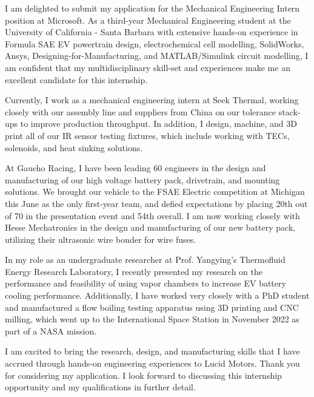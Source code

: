 \documentclass[11pt, letterpaper]{awesome-cv} %
\begin{document}
\makecvheader %

\makelettertitle %


\begin{cvletter}


I am delighted to submit my application for the Mechanical Engineering Intern position at Microsoft. As a third-year Mechanical Engineering student at the University of California - Santa Barbara with extensive hands-on experience in Formula SAE EV powertrain design, electrochemical cell modelling, SolidWorks, Ansys, Designing-for-Manufacturing, and MATLAB/Simulink circuit modelling, I am confident that my multidisciplinary skill-set and experiences make me an excellent candidate for this internship.

Currently, I work as a mechanical engineering intern at Seek Thermal, working closely with our assembly line and suppliers from China on our tolerance stack-ups to improve production throughput. In addition, I design, machine, and 3D print all of our IR sensor testing fixtures, which include working with TECs, solenoids, and heat sinking solutions.

At Gaucho Racing, I have been leading 60 engineers in the design and manufacturing of our high voltage battery pack, drivetrain, and mounting solutions. We brought our vehicle to the FSAE Electric competition at Michigan this June as the only first-year team, and defied expectations by placing 20th out of 70 in the presentation event and 54th overall. I am now working closely with Hesse Mechatronics in the design and manufacturing of our new battery pack, utilizing their ultrasonic wire bonder for wire fuses. 

In my role as an undergraduate researcher at Prof. Yangying's Thermofluid Energy Research Laboratory, I recently presented my research on the performance and feasibility of using vapor chambers to increase EV battery cooling performance. Additionally, I have worked very closely with a PhD student and manufactured a flow boiling testing apparatus using 3D printing and CNC milling, which went up to the International Space Station in November 2022 as part of a NASA mission. 

I am excited to bring the research, design, and manufacturing skills that I have accrued through hands-on engineering experiences to Lucid Motors. Thank you for considering my application. I look forward to discussing this internship opportunity and my qualifications in further detail.


\end{cvletter}


\makeletterclosing %
\end{document}
